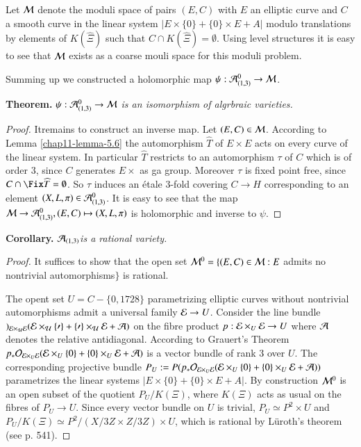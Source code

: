 Let $\mathcal{M}$ denote the moduli space of pairs $(E, C)$ with $E$ an elliptic curve and $C$ a smooth curve in the linear system $|E \times \{0\} + \{0\} \times E + A|$ modulo translations by elements of $K(\widehat{\Xi})$ such that $C\cap K(\widehat{\Xi}) = \emptyset$. Using level structures it is easy to see that $\mathcal{M}$ exists as a coarse mouli space for this moduli problem.

Summing up we constructed a holomorphic map $\psi : \mathcal{A}_{(1,3)}^{0} \rightarrow \mathcal{M}$.

\medskip
\noindent
{\bfseries {} Theorem.\label{chap11-thm-6.1}} $\psi : \mathcal{A}_{(1,3)}^{0} \rightarrow \mathcal{M}$ \textit{is an isomorphism of algrbraic varieties.}

\begin{proof}
It\pageoriginale remains to construct an inverse map. Let $(E, C) \in \mathcal{M}$. According to Lemma \ref{chap11-lemma-5.6}
the automorphism $\widehat{T}$ of $E \times E$ acts on every curve of the linear system. In particular $\widehat{T}$ restricts to an automorphism $\tau$ of $C$  which is of order 3, since $C$ generates $E \times $ as ga group. Moreover $\tau$ is fixed point free, since $C \cap \Fix \widehat{T}= \emptyset$. So $\tau$ induces an \'etale 3-fold covering $C \rightarrow H$ corresponding to an element $(X, L, \pi) \in \mathcal{A}_{(1,3)}^{0}$. It is easy to see that the map $\mathcal{M} \rightarrow \mathcal{A}_{(1,3)}^{0}, (E, C)\mapsto (X, L, \pi)$ is holomorphic and inverse to $\psi$.
\end{proof}

\medskip
\noindent
{\bfseries {} Corollary.\label{chap11-thm-6.2}} $\mathcal{A}_{(1,3)}$\textit{is a rational variety.}

\begin{proof}
It suffices to show that the open set $\mathcal{M}^{0} =\{(E, C)\in \mathcal{M} : E$ admits no nontrivial automorphisms$\}$ is rational.

The opent set $U = C-\{0,1728\}$ parametrizing elliptic curves without nontrivial automorphisms admit a universal family $\mathcal{E} \rightarrow U$. Consider the line bundle $\cal)_{\mathcal{E} \times_{U} \mathcal{E}}(\mathcal{E} \times_{U}\{0\} + \{0\} \times_{U}\mathcal{E} + \mathcal{A})$ on the fibre product $p: \mathcal{E} \times_{U} \mathcal{E} \rightarrow U$ where $\mathcal{A}$ denotes the relative antidiagonal. According to Grauert's Theorem $p_{*}\mathcal{O}_{\mathcal{E}\times_{U}\mathcal{E}}(\mathcal{E} \times_{U}\{0\} + \{0\} \times_{U}\mathcal{E} + \mathcal{A})$ is a vector bundle of rank 3 over $U$. The corresponding projective bundle $P_{U}:=P(p_{*}\mathcal{O}_{\mathcal{E} \times_{U}\mathcal{E}}(\mathcal{E} \times_{U}\{ 0\} + \{0\} \times_{U}\mathcal{E} + \mathcal{A}))$ parametrizes the linear systems $|E \times \{0\} + \{0\} \times E + A|$. By construction $\mathcal{M}^{0}$ is an open subset of the quotient $P_{U}/K(\Xi)$, where $K(\Xi)$ acts as usual on the fibres of $P_{U}\rightarrow U$. Since every vector bundle on $U$ is trivial, $P_{U}\simeq P^{2} \times U$ and $P_{U}/K(\Xi)\simeq P^{2} /(X/3Z \times Z /3Z)\times U$, which is
rational by L\"uroth's theorem (see \cite{chap11-keyG-H} p. 541).
\end{proof}

